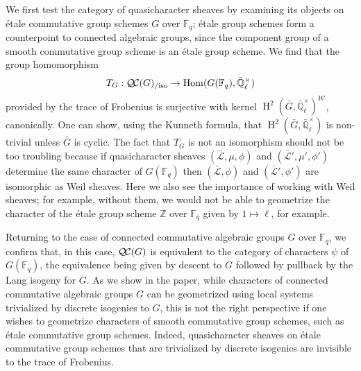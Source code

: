 \documentclass{amsart}
\theoremstyle{plain}
\theoremstyle{definition}
\theoremstyle{remark}
\newcommand{\FF}{{\mathbb{F}}}
\newcommand{\ZZ}{{\mathbb{Z}}}
\newcommand{\EE}{\mathbb{\bar Q}_\ell}
\newcommand{\Fq}{k}
\newcommand{\EEx}{\EE^\times}
\newcommand{\Weil}[1]{\mathcal{W}_{#1}}
\DeclareMathOperator{\Gal}{Gal}
\DeclareMathOperator{\Hom}{Hom}
\DeclareMathOperator{\Hh}{H}
\newcommand{\gqcs}[1]{{\mathcal{\bar #1}}}
\newcommand{\QC}{{\mathcal{Q\hskip-0.8pt C}}}
\newcommand{\QCiso}[1]{\QC(#1)_{/\text{iso}}}
\newcommand{\bG}{\bar{G}}
\begin{document}
We first test the category of quasicharacter sheaves by examining its objects on étale commutative group schemes $G$ over $\FF_q$; étale group schemes form a counterpoint to connected algebraic groups, since the component group of a smooth commutative group scheme is an étale group scheme. 
We find that the group homomorphism 
\begin{equation}
T_G: \QCiso{G} \to \Hom(G(\FF_q),\EEx)
\end{equation}
provided by the trace of Frobenius is surjective with kernel $\Hh^2(\bG,\EEx)^{\Weil{}}$, canonically.
One can show, using the Kunneth formula, that $\Hh^2(\bG,\EEx)$ is non-trivial unless $\bG$ is cyclic.
The fact that $T_G$ is not an isomorphism should not be too troubling because if quasicharacter sheaves $(\gqcs{L}, \mu,\phi)$ and $(\gqcs{L}', \mu',\phi')$ determine the same character of $G(\FF_q)$ then $(\gqcs{L},\phi)$ and $(\gqcs{L}',\phi')$ are isomorphic as Weil sheaves.
Here we also see the importance of working with Weil sheaves; for example, without them, we would not be able to geometrize the character of the étale group scheme $\ZZ$ over $\FF_q$ given by $1\mapsto \ell$, for example.

Returning to the case of connected commutative algebraic groups $G$ over $\FF_q$, we confirm that, in this case, $\QC(G)$ is equivalent to the category of characters $\psi$ of $G(\FF_q)$, the equivalence being given by descent to $G$ followed by pullback by the Lang isogeny for $G$. 
%
%
As we show in the paper, while characters of connected commutative algebraic groups $G$ can be geometrized using  local systems trivialized by discrete isogenies to $G$, this is not the right perspective if one wishes to geometrize characters of smooth commutative group schemes, such as étale commutative group schemes. Indeed, quasicharacter sheaves on étale commutative group schemes that are trivialized by discrete isogenies are invisible to the trace of Frobenius.
\end{document}
